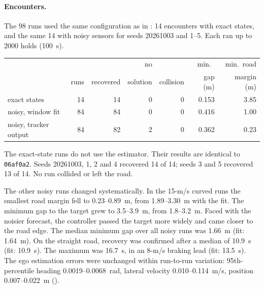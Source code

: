 \documentclass[11pt]{article}
\begin{document}
\paragraph{Encounters.} The 98 runs used the same configuration as in
: 14 encounters with exact states, and the
same 14 with noisy sensors for seeds 20261003 and 1--5. Each ran up to 2000
holds (100~s).
\begin{center}
\begin{tabular}{lrrrrrr}
\toprule
 & & & no & & min.\ & min.\ road\\
 & runs & recovered & solution & collision & gap (m) & margin (m)\\
\midrule
exact states & 14 & 14 & 0 & 0 & 0.153 & 3.85\\
noisy, window fit & 84 & 84 & 0 & 0 & 0.416 & 1.00\\
noisy, tracker output & 84 & 82 & 2 & 0 & 0.362 & 0.23\\
\bottomrule
\end{tabular}
\end{center}
The exact-state runs do not use the estimator. Their results are identical to
\texttt{06af0a2}. Seeds 20261003, 1, 2 and 4 recovered 14 of 14; seeds 3 and 5
recovered 13 of 14. No run collided or left the road.

The other noisy runs changed systematically. In the 15-m/s curved runs the
smallest road margin fell to 0.23--0.89~m, from 1.89--3.30~m with the fit. The
minimum gap to the target grew to 3.5--3.9~m, from 1.8--3.2~m. Faced with the
noisier forecast, the controller passed the target more widely and came closer
to the road edge. The median minimum gap over all noisy runs was 1.66~m
(fit: 1.64~m). On the straight road, recovery was confirmed after a median of
10.9~s (fit: 10.9~s). The maximum was 16.7~s, in an 8-m/s braking lead (fit:
13.5~s). The ego estimation errors were unchanged within run-to-run variation:
95th-percentile heading 0.0019--0.0068~rad, lateral velocity
0.010--0.114~m/s, position 0.007--0.022~m
().
\end{document}
